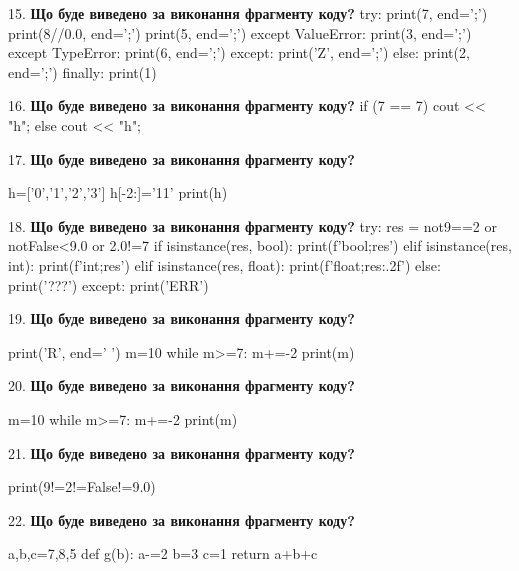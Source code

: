 \documentclass[11pt]{article}
\begin{document}
\par\vspace{5mm}
15. \textbf{Що буде виведено за виконання фрагменту коду?}
try:
    print(7, end=';')
    print(8//0.0, end=';')
    print(5, end=';')
except ValueError:
    print(3, end=';')
except TypeError:
    print(6, end=';')
except:
    print('Z', end=';')
else:
    print(2, end=';')
finally:
    print(1)
\par\vspace{5mm}
16. \textbf{Що буде виведено за виконання фрагменту коду?}
if (7 == 7)
    cout << "h";
else
    cout << "h";

\par\vspace{5mm}
17. \textbf{Що буде виведено за виконання фрагменту коду?}

h=['0','1','2','3']
h[-2:]='11'
print(h)

\par\vspace{5mm}
18. \textbf{Що буде виведено за виконання фрагменту коду?}
try:
    res = not9==2 or notFalse<9.0 or 2.0!=7
    if isinstance(res, bool):
        print(f'bool;{res}')
    elif isinstance(res, int):
        print(f'int;{res}')
    elif isinstance(res, float):
        print(f'float;{res:.2f}')
    else:
        print('???')
except:
    print('ERR')
\par\vspace{5mm}
19. \textbf{Що буде виведено за виконання фрагменту коду?}

print('R', end=' ')
m=10
while m>=7:
    m+=-2
print(m)

\par\vspace{5mm}
20. \textbf{Що буде виведено за виконання фрагменту коду?}

m=10
while m>=7:
    m+=-2
print(m)

\par\vspace{5mm}
21. \textbf{Що буде виведено за виконання фрагменту коду?}

print(9!=2!=False!=9.0)
\par\vspace{5mm}
22. \textbf{Що буде виведено за виконання фрагменту коду?}

a,b,c=7,8,5
def g(b):
    a-=2
    b=3
    c=1
    return a+b+c
\end{document}
